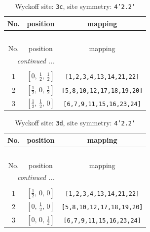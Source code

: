 \documentclass[fleqn,8pt]{jsarticle}
\begin{document}
\begin{longtable}{ccc}
\caption{Wyckoff site: {\tt 3c}, site symmetry: {\tt 4'2.2'}}
 \\
 \hline \hline
No. & position & mapping \\ \hline \endfirsthead

\multicolumn{2}{l}{\tablename\ \thetable{}} \\
 \hline \hline
No. & position & mapping \\ \hline \endhead

 \hline \hline
\multicolumn{2}{r}{\footnotesize\it continued ...} \\ \endfoot

 \hline \hline
\multicolumn{2}{r}{} \\ \endlastfoot

1 & $\left[ 0,\, \frac{1}{2},\, \frac{1}{2} \right]$ & {\tt [1,2,3,4,13,14,21,22]} \\ \hline
2 & $\left[ \frac{1}{2},\, 0,\, \frac{1}{2} \right]$ & {\tt [5,8,10,12,17,18,19,20]} \\ \hline
3 & $\left[ \frac{1}{2},\, \frac{1}{2},\, 0 \right]$ & {\tt [6,7,9,11,15,16,23,24]} \\
\end{longtable}
\renewcommand{\arraystretch}{1.2}
\begin{longtable}{ccc}
\caption{Wyckoff site: {\tt 3d}, site symmetry: {\tt 4'2.2'}}
 \\
 \hline \hline
No. & position & mapping \\ \hline \endfirsthead

\multicolumn{2}{l}{\tablename\ \thetable{}} \\
 \hline \hline
No. & position & mapping \\ \hline \endhead

 \hline \hline
\multicolumn{2}{r}{\footnotesize\it continued ...} \\ \endfoot

 \hline \hline
\multicolumn{2}{r}{} \\ \endlastfoot

1 & $\left[ \frac{1}{2},\, 0,\, 0 \right]$ & {\tt [1,2,3,4,13,14,21,22]} \\ \hline
2 & $\left[ 0,\, \frac{1}{2},\, 0 \right]$ & {\tt [5,8,10,12,17,18,19,20]} \\ \hline
3 & $\left[ 0,\, 0,\, \frac{1}{2} \right]$ & {\tt [6,7,9,11,15,16,23,24]} \\
\end{longtable}
\renewcommand{\arraystretch}{1.2}
\end{document}
